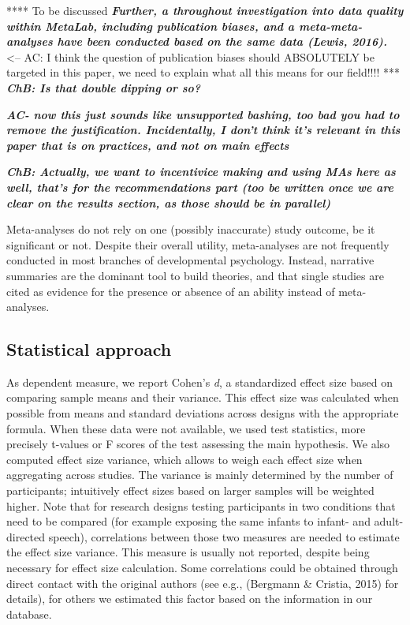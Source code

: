 \documentclass[english,floatsintext,man]{apa6}
\newcounter{author}
\begin{document}
**** To be discussed\textbf{\emph{ Further, a throughout investigation
into data quality within MetaLab, including publication biases, and a
meta-meta-analyses have been conducted based on the same data (Lewis,
2016). }}\textless{}-- AC: I think the question of publication biases
should ABSOLUTELY be targeted in this paper, we need to explain what all
this means for our field!!!! *** \textbf{\emph{ChB: Is that double
dipping or so?}}

\textbf{\emph{AC- now this just sounds like unsupported bashing, too bad
you had to remove the justification. Incidentally, I don't think it's
relevant in this paper that is on practices, and not on main effects}}

\textbf{\emph{ChB: Actually, we want to incentivice making and using MAs
here as well, that's for the recommendations part (too be written once
we are clear on the results section, as those should be in parallel)}}

Meta-analyses do not rely on one (possibly inaccurate) study outcome, be
it significant or not. Despite their overall utility, meta-analyses are
not frequently conducted in most branches of developmental psychology.
Instead, narrative summaries are the dominant tool to build theories,
and that single studies are cited as evidence for the presence or
absence of an ability instead of meta-analyses.

\subsection{Statistical approach}\label{statistical-approach}

As dependent measure, we report Cohen's \emph{d}, a standardized effect
size based on comparing sample means and their variance. This effect
size was calculated when possible from means and standard deviations
across designs with the appropriate formula. When these data were not
available, we used test statistics, more precisely t-values or F scores
of the test assessing the main hypothesis. We also computed effect size
variance, which allows to weigh each effect size when aggregating across
studies. The variance is mainly determined by the number of
participants; intuitively effect sizes based on larger samples will be
weighted higher. Note that for research designs testing participants in
two conditions that need to be compared (for example exposing the same
infants to infant- and adult-directed speech), correlations between
those two measures are needed to estimate the effect size variance. This
measure is usually not reported, despite being necessary for effect size
calculation. Some correlations could be obtained through direct contact
with the original authors (see e.g., (Bergmann \& Cristia, 2015) for
details), for others we estimated this factor based on the information
in our database.
\end{document}
